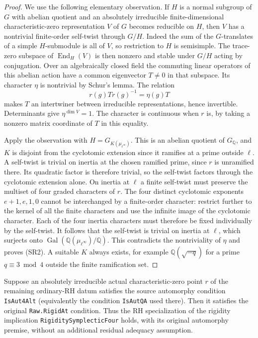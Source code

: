 \begin{proof}
We use the following elementary observation. If \(H\) is a normal
subgroup of \(G\) with abelian quotient and an absolutely
irreducible finite-dimensional characteristic-zero representation
\(V\) of \(G\) becomes reducible on \(H\), then \(V\) has a
nontrivial finite-order self-twist through \(G/H\).
Indeed the sum of the \(G\)-translates of a simple \(H\)-submodule
is all of \(V\), so restriction to \(H\) is semisimple.
The trace-zero subspace of \(\operatorname{End}_H(V)\)
is then nonzero and stable under \(G/H\) acting by conjugation.
Over an algebraically closed field the commuting linear
operators of this abelian action have a common eigenvector
\(T\ne0\) in that subspace. Its character \(\eta\) is nontrivial
by Schur's lemma. The relation
\[
 r(g)Tr(g)^{-1}=\eta(g)T
\]
makes \(T\) an intertwiner between irreducible representations,
hence invertible. Determinants give \(\eta^{\dim V}=1\).
The character is continuous when \(r\) is, by taking a nonzero
matrix coordinate of \(T\) in this equality.

Apply the observation with \(H=G_{K(\mu_{\ell^\infty})}\).
This is an abelian quotient of \(G_{\mathbb Q}\), and
\(K\) is disjoint from the cyclotomic extension since it
ramifies at a prime outside \(\ell\).
A self-twist is trivial on inertia at the chosen ramified
prime, since \(r\) is unramified there. Its quadratic
factor is therefore trivial, so the self-twist factors
through the cyclotomic extension alone.
On inertia at \(\ell\) a finite self-twist must preserve
the multiset of four graded characters of \(r\).
The four distinct cyclotomic exponents \(e+1,e,1,0\)
cannot be interchanged by a finite-order character:
restrict further to the kernel of all the finite
characters and use the infinite image of the cyclotomic
character. Each of the four inertia characters must
therefore be fixed individually by the self-twist.
It follows that the self-twist is trivial on inertia at
\(\ell\), which surjects onto
\(\operatorname{Gal}(\mathbb Q(\mu_{\ell^\infty})/\mathbb Q)\).
This contradicts the nontriviality of \(\eta\) and proves (SR2).
A suitable \(K\) always exists, for example
\(\mathbb Q(\sqrt{-q})\) for a prime \(q\equiv3\bmod4\)
outside the finite ramification set.
\end{proof}

\begin{theorem}
\label{thm:rh-symplectic-rigidity}
Suppose an absolutely irreducible actual characteristic-zero
point \(r\) of the remaining ordinary-RH datum satisfies
the source automorphy condition \texttt{IsAut4Alt} (equivalently
the condition \texttt{IsAutQA} used there).
Then it satisfies the original \texttt{Raw.RigidAt} condition.
Thus the RH specialization of the rigidity implication
\texttt{RigiditySymplecticFour} holds, with its original
automorphy premise, without an additional residual adequacy
assumption.
\end{theorem}

